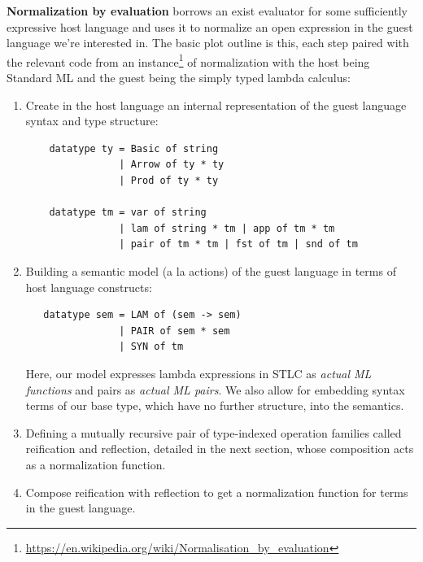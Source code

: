 \documentclass[11pt]{article}
\begin{document}
\textbf{Normalization by evaluation} borrows an exist evaluator for some sufficiently
expressive host language and uses it to normalize an open expression in the
guest language we're interested in. The basic plot outline is this, each step
paired with the relevant code from an instance\footnote{\url{https://en.wikipedia.org/wiki/Normalisation\_by\_evaluation}} of normalization with the host
being Standard ML and the guest being the simply typed lambda calculus:
\begin{enumerate}
\item Create in the host language an internal representation of the guest language syntax and type structure:
\begin{verbatim}
    datatype ty = Basic of string
                | Arrow of ty * ty
                | Prod of ty * ty

    datatype tm = var of string
                | lam of string * tm | app of tm * tm
                | pair of tm * tm | fst of tm | snd of tm
\end{verbatim}
\item Building a semantic model (a la actions) of the guest language in terms of host language constructs:

\begin{verbatim}
   datatype sem = LAM of (sem -> sem)
                | PAIR of sem * sem
                | SYN of tm
\end{verbatim}

   Here, our model expresses lambda expressions in STLC as \emph{actual ML
functions} and pairs as \emph{actual ML pairs}. We also allow for embedding syntax
terms of our base type, which have no further structure, into the semantics.

\item Defining a mutually recursive pair of type-indexed operation families called
reification and reflection, detailed in the next section, whose composition
acts as a normalization function.
\item Compose reification with reflection to get a normalization function for terms
in the guest language.
\end{enumerate}
\end{document}
